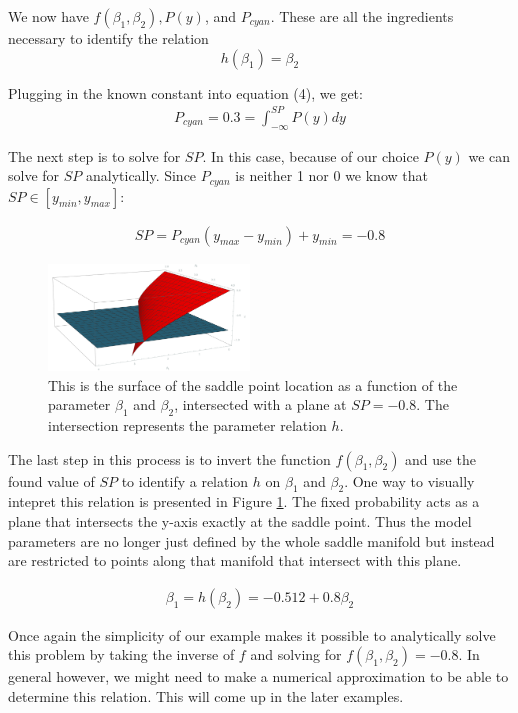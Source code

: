 \documentclass[letterpaper]{article}
\begin{document}
We now have $f(\beta_1,\beta_2), P(y)$, and $P_{cyan}$. These are all the 
ingredients necessary to identify the relation 
\[h(\beta_1) = \beta_2\]

Plugging in the known constant into equation (4), we get:
\begin{eqnarray}
  P_{cyan} = 0.3 = \int_{-\infty}^{SP} P(y)dy
\end{eqnarray}

The next step is to solve for $SP$. In this case, because of our choice $P(y)$
we can solve for $SP$ analytically. Since $P_{cyan}$ is neither 1 nor 0 we know 
that $SP \in [y_{min},y_{max}]$:

\begin{eqnarray}
  SP = P_{cyan}(y_{max}-y_{min}) + y_{min} = -0.8
\end{eqnarray}

\begin{figure}[t]
\begin{center}
\includegraphics[width=2.1in,angle=0]{./cubic_h.png}
\caption{This is the surface of the saddle point location as a function of
the parameter $\beta_1$ and $\beta_2$, intersected with a plane at $SP=-0.8$.
The intersection represents the parameter relation $h$.}
\label{cubic_h}
\end{center}
\end{figure}

The last step in this process is to invert the function $f(\beta_1,\beta_2)$ 
and use the found value of $SP$ to identify a relation $h$ on $\beta_1$ and $\beta_2$.
One way to visually intepret this relation is presented in Figure \ref{cubic_h}.
The fixed probability acts as a plane that intersects the y-axis exactly at the
saddle point. Thus the model parameters are no longer just defined by the whole
saddle manifold but instead are restricted to points along that manifold that intersect
with this plane. 


\begin{eqnarray}
    \beta_1 = h(\beta_2) = -0.512 + 0.8 \beta_2
\end{eqnarray}

Once again the simplicity of our example makes it possible to analytically 
solve this problem
by taking the inverse of $f$ and solving for $f(\beta_1,\beta_2) = -0.8$.
In general however, we might need to make a numerical
approximation to be able to determine this relation. This will come up in the 
later examples.
\end{document}
